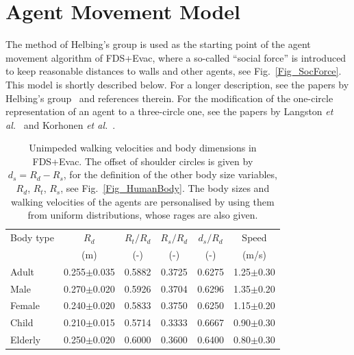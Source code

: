 \documentclass[12pt,a4paper,final,twoside]{stylevk}
\begin{document}
\section{Agent Movement Model}\label{Sec_MoveModel}

\noindent The method of Helbing's group is used as the starting point
of the agent movement algorithm of FDS+Evac, where a so-called
``social force'' is introduced to keep reasonable distances to walls
and other agents, see Fig.~\ref{Fig_SocForce}.  This model is
shortly described below.  For a longer description, see the papers by
Helbing's group~\cite{Helbing95, Helbing00, Helbing02, Werner03} and
references therein.  For the modification of the one-circle
representation of an agent to a three-circle one, see the papers by
Langston {\em et al.}~\cite{Langston06} and Korhonen {\em et
  al.}~\cite{Korhonen07a, Korhonen07b, Korhonen08a, Korhonen08b}.

%
\begin{table}[b!]
\begin{center}
\caption{Unimpeded walking velocities and body dimensions in FDS+Evac.
   The offset of shoulder circles is given by $d_s = R_d - R_s$, for the
   definition of the other body size variables, $R_d$, $R_t$, $R_s$,
   see Fig.~\protect\ref{Fig_HumanBody}.  The body sizes and walking
   velocities of the agents are personalised by using them from uniform
   distributions, whose rages are also given.}\label{Table_DefaultHumans}  
\vspace{12pt}
\begin{tabular}{l c c c c c}\hline\hline 
Body type & $R_d$& $R_t/R_d$ & $R_s/R_d$  & $d_s/R_d$ & Speed \\
          & (m)  & (-)   &  (-)    & (-)    & (m/s) \\ \hline
Adult     & 0.255$\pm$0.035 & 0.5882 & 0.3725 & 0.6275 & 
          1.25$\pm$0.30 \\  %
Male      & 0.270$\pm$0.020 & 0.5926 & 0.3704 & 0.6296 &
          1.35$\pm$0.20 \\  %
Female    & 0.240$\pm$0.020 & 0.5833 & 0.3750 & 0.6250 & 
          1.15$\pm$0.20 \\  %
Child     & 0.210$\pm$0.015 & 0.5714 & 0.3333 & 0.6667 & 
          0.90$\pm$0.30 \\  %
Elderly   & 0.250$\pm$0.020 & 0.6000 & 0.3600 & 0.6400 & 
          0.80$\pm$0.30 \\ \hline\hline  %
\end{tabular}
\end{center}
\end{table}
%
\end{document}
